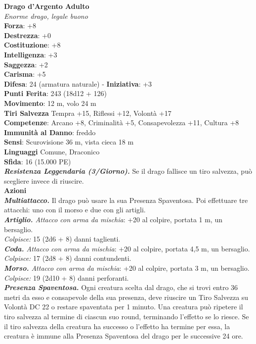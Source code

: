 \begin{multicols}{2}
\medskip\textbf{Drago d'Argento Adulto}\\
\emph{Enorme drago, legale buono}\\
\textbf{Forza}: +8\\
\textbf{Destrezza}: +0\\
\textbf{Costituzione}: +8\\
\textbf{Intelligenza}: +3\\
\textbf{Saggezza}: +2\\
\textbf{Carisma}: +5\\
\textbf{Difesa}: 24 (armatura naturale) - \textbf{Iniziativa}: +3\\
\textbf{Punti Ferita}: 243 (18d12 + 126)\\
\textbf{Movimento}: 12 m, volo 24 m\\
\textbf{Tiri Salvezza} Tempra +15, Riflessi +12, Volontà +17\\
\textbf{Competenze}: Arcano +8, Criminalità +5, Consapevolezza +11, Cultura +8\\
\textbf{Immunità al Danno}: freddo\\
\textbf{Sensi}: Scurovisione 36 m, vista cieca 18 m\\
\textbf{Linguaggi} Comune, Draconico\\
\textbf{Sfida}: 16 (15.000 PE)\smallskip\\
\emph{\textbf{Resistenza Leggendaria (3/Giorno).}} Se il drago fallisce un tiro salvezza, può scegliere invece di riuscire.\\
\smallskip\textbf{Azioni}\\
\emph{\textbf{Multiattacco.}} Il drago può usare la sua Presenza Spaventosa. Poi effettuare tre attacchi: uno con il morso e due con gli artigli.\\
\emph{\textbf{Artiglio.} Attacco con arma da mischia}: +20 al colpire, portata 1 m, un bersaglio.\\
\emph{Colpisce:} 15 (2d6 + 8) danni taglienti.\\
\emph{\textbf{Coda.} Attacco con arma da mischia}: +20 al colpire, portata 4,5 m, un bersaglio.\\
\emph{Colpisce:} 17 (2d8 + 8) danni contundenti.\\
\emph{\textbf{Morso.} Attacco con arma da mischia}: +20 al colpire, portata 3 m, un bersaglio.\\
\emph{Colpisce:} 19 (2d10 + 8) danni perforanti.\\
\emph{\textbf{Presenza Spaventosa.}} Ogni creatura scelta dal drago, che si trovi entro 36 metri da esso e consapevole della sua presenza, deve riuscire un Tiro Salvezza su Volontà DC  22 o restare spaventata per 1 minuto. Una creatura può ripetere il tiro salvezza al termine di ciascun suo round, terminando l'effetto se lo riesce. Se il tiro salvezza della creatura ha successo o l'effetto ha termine per essa, la creatura è immune alla Presenza Spaventosa del drago per le successive 24 ore.\\

\end{multicols}
